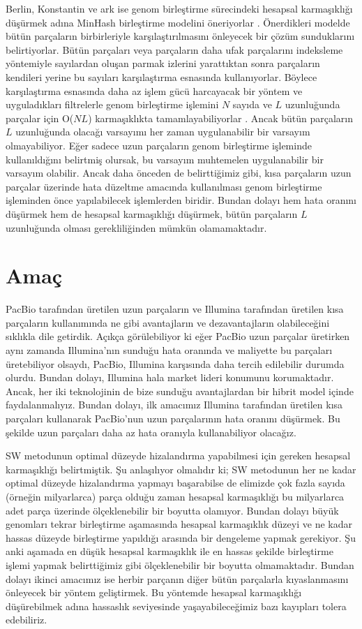 Berlin, Konstantin ve ark ise genom birleştirme sürecindeki hesapsal karmaşıklığı düşürmek adına MinHash birleştirme modelini öneriyorlar \cite{Berlin2015}. Önerdikleri modelde bütün parçaların birbirleriyle karşılaştırılmasını önleyecek bir çözüm sunduklarını belirtiyorlar. Bütün parçaları veya parçaların daha ufak parçalarını indeksleme yöntemiyle sayılardan oluşan parmak izlerini yarattıktan sonra parçaların kendileri yerine bu sayıları karşılaştırma esnasında kullanıyorlar. Böylece karşılaştırma esnasında daha az işlem gücü harcayacak bir yöntem ve uyguladıkları filtrelerle genom birleştirme işlemini $N$ sayıda ve $L$ uzunluğunda parçalar için O($N$$L$) karmaşıklıkta tamamlayabiliyorlar \cite{Berlin2015}. Ancak bütün parçaların $L$ uzunluğunda olacağı varsayımı her zaman uygulanabilir bir varsayım olmayabiliyor. Eğer sadece uzun parçaların genom birleştirme işleminde kullanıldığını belirtmiş olursak, bu varsayım muhtemelen uygulanabilir bir varsayım olabilir. Ancak daha önceden de belirttiğimiz gibi, kısa parçaların uzun parçalar üzerinde hata düzeltme amacında kullanılması genom birleştirme işleminden önce yapılabilecek işlemlerden biridir. Bundan dolayı hem hata oranını düşürmek hem de hesapsal karmaşıklığı düşürmek, bütün parçaların $L$ uzunluğunda olması gerekliliğinden mümkün olamamaktadır.

\section{Amaç}

PacBio tarafından üretilen uzun parçaların ve Illumina tarafından üretilen kısa parçaların kullanımında ne gibi avantajların ve dezavantajların olabileceğini sıklıkla dile getirdik. Açıkça görülebiliyor ki eğer PacBio uzun parçalar üretirken aynı zamanda Illumina'nın sunduğu hata oranında ve maliyette bu parçaları üretebiliyor olsaydı, PacBio, Illumina karşısında daha tercih edilebilir durumda olurdu. Bundan dolayı, Illumina hala market lideri konumunu korumaktadır. Ancak, her iki teknolojinin de bize sunduğu avantajlardan bir hibrit model içinde faydalanmalıyız. Bundan dolayı, ilk amacımız Illumina tarafından üretilen kısa parçaları kullanarak PacBio'nun uzun parçalarının hata oranını düşürmek. Bu şekilde uzun parçaları daha az hata oranıyla kullanabiliyor olacağız.

SW metodunun optimal düzeyde hizalandırma yapabilmesi için gereken hesapsal karmaşıklığı belirtmiştik. Şu anlaşılıyor olmalıdır ki; SW metodunun her ne kadar optimal düzeyde hizalandırma yapmayı başarabilse de elimizde çok fazla sayıda (örneğin milyarlarca) parça olduğu zaman hesapsal karmaşıklığı bu milyarlarca adet parça üzerinde ölçeklenebilir bir boyutta olamıyor. Bundan dolayı büyük genomları tekrar birleştirme aşamasında hesapsal karmaşıklık düzeyi ve ne kadar hassas düzeyde birleştirme yapıldığı arasında bir dengeleme yapmak gerekiyor. Şu anki aşamada en düşük hesapsal karmaşıklık ile en hassas şekilde birleştirme işlemi yapmak belirttiğimiz gibi ölçeklenebilir bir boyutta olmamaktadır. Bundan dolayı ikinci amacımız ise herbir parçanın diğer bütün parçalarla kıyaslanmasını önleyecek bir yöntem geliştirmek. Bu yöntemde hesapsal karmaşıklığı düşürebilmek adına hassaslık seviyesinde yaşayabileceğimiz bazı kayıpları tolera edebiliriz.

